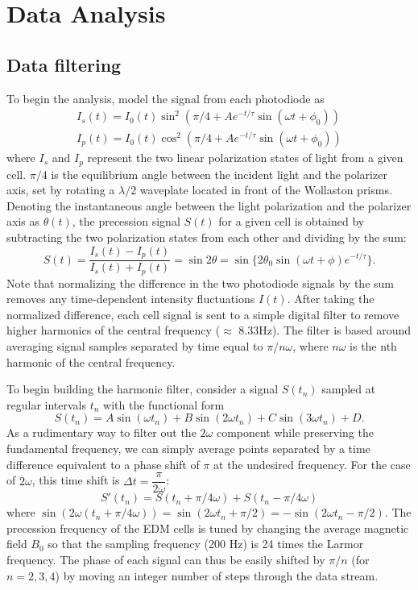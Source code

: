 \documentclass [10pt, twoside] {uwthesis}[2012/04/02]
\begin{document}
\chapter{Data Analysis}
\section{Data filtering}
\label{Digital_filter}
To begin the analysis, model the signal from each photodiode as 
\begin{align}
I_s(t) = I_0(t) \sin^2(\pi/4 + Ae^{-t/\tau}\sin(\omega t + \phi_0)) \\
I_p(t) = I_0(t) \cos^2(\pi/4 + Ae^{-t/\tau}\sin(\omega t + \phi_0)) 
\end{align}
where $I_s$ and $I_p$ represent the two linear polarization states of light from a given cell. $\pi/4$ is the equilibrium angle between the incident light and the polarizer axis, set by rotating a $\lambda/2$ waveplate located in front of the Wollaston prisms. Denoting the instantaneous angle between the light polarization and the polarizer axis as $\theta(t)$, the precession signal $S(t)$ for a given cell is obtained by subtracting the two polarization states from each other and dividing by the sum:
\begin{equation}
S(t) = \frac{I_s(t)-I_p(t)}{I_s(t)+I_p(t)} = \sin{2\theta} = \sin\lbrace 2\theta_0 \sin(\omega t + \phi) e^{-t/\tau}\rbrace. 
\end{equation}
Note that normalizing the difference in the two photodiode signals by the sum removes any time-dependent intensity fluctuations $I(t)$. After taking the normalized difference, each cell signal is sent to a simple digital filter to remove higher harmonics of the central frequency ($\approx$ 8.33Hz). The filter is based around averaging signal samples separated by time equal to $\pi/n\omega$, where $n\omega$ is the nth harmonic of the central frequency.

To begin building the harmonic filter, consider a signal $S(t_n)$ sampled at regular intervals $t_n$ with the functional form
\begin{equation} \label{S}
S(t_n) = A \sin(\omega t_n) + B \sin(2\omega t_n) + C \sin(3\omega t_n) + D. 
\end{equation}
As a rudimentary way to filter out the $2\omega$ component while preserving the fundamental frequency, we can simply average points separated by a time difference equivalent to a phase shift of $\pi$ at the undesired frequency. For the case of $2\omega$, this time shift is $\Delta t = \dfrac{\pi}{2\omega}$: 
\begin{equation}
S'(t_n) = S(t_n + \pi/4\omega) + S(t_n - \pi/4\omega)
\end{equation}
where $\sin(2\omega (t_n + \pi/4\omega)) = \sin(2\omega t_n + \pi/2) = - \sin(2\omega t_n - \pi/2).$ The precession frequency of the EDM cells is tuned by changing the average magnetic field $B_0$ so that the sampling frequency (200 Hz) is 24 times the Larmor frequency. The phase of each signal can thus be easily shifted by $\pi/n $ (for $n=2,3,4$) by moving an integer number of steps through the data stream.
\end{document}
